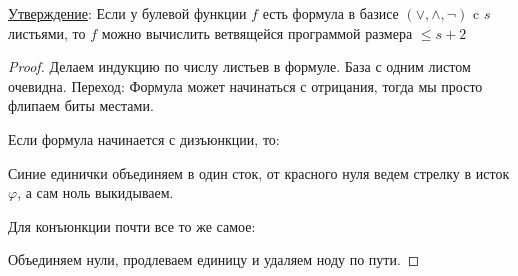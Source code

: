 \underline{Утверждение}: Если у булевой функции $f$ есть формула в базисе $(\lor, \land, \lnot)$ c  $s$ листьями, то $f$ можно вычислить ветвящейся программой
размера $\leqslant s + 2$
\begin{proof}
  Делаем индукцию по числу листьев в формуле. База с одним листом очевидна. 
  Переход: Формула может начинаться с отрицания, тогда мы просто флипаем биты местами. 
  \begin{center}
  \end{center}
  Если формула начинается с дизъюнкции, то:
  \begin{center}
  \end{center}
  Синие единички объединяем в один сток, от красного нуля ведем стрелку в исток $\varphi$, а сам ноль выкидываем.
  
  Для конъюнкции почти все то же самое:
  \begin{center}
  \end{center}
Объединяем нули, продлеваем единицу и удаляем ноду по пути. 
\end{proof}

